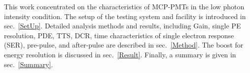This work concentrated on the characteristics of MCP-PMTs in the low photon intensity condition. The setup of the testing system and facility is introduced in sec.~\ref{SetUp}. Detailed analysis methods and results, including Gain, single PE resolution, PDE, TTS, DCR, time characteristics of single electron response (SER), pre-pulse, and after-pulse are described in sec.~\ref{Method}. The boost for energy resolution is discussed in sec.~\ref{Result}. Finally, a summary is given in sec.~\ref{Summary}.
